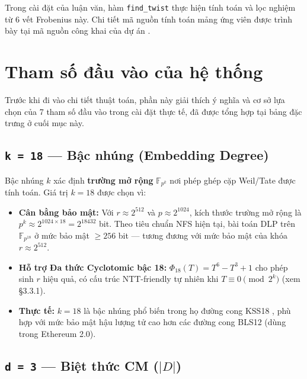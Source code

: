 Trong cài đặt của luận văn, hàm \texttt{find\_twist} thực hiện tính toán
và lọc nghiệm từ 6 vết Frobenius này. Chi tiết mã nguồn tính toán mảng
ứng viên được trình bày tại mã nguồn công khai của dự án
\citep{LumenMath}.

\section{Tham số đầu vào của hệ
thống}\label{tham-sux1ed1-ux111ux1ea7u-vuxe0o-cux1ee7a-hux1ec7-thux1ed1ng}

Trước khi đi vào chi tiết thuật toán, phần này giải thích ý nghĩa và cơ
sở lựa chọn của 7 tham số đầu vào trong cài đặt thực tế, đã được tổng
hợp tại bảng đặc trưng ở cuối mục này.

\subsection{\texorpdfstring{\texttt{k\ =\ 18} --- Bậc nhúng (Embedding
Degree)}{k = 18 --- Bậc nhúng (Embedding Degree)}}\label{k-18-bux1eadc-nhuxfang-embedding-degree}

Bậc nhúng \(k\) xác định \textbf{trường mở rộng} \(\mathbb{F}_{p^k}\)
nơi phép ghép cặp Weil/Tate được tính toán. Giá trị \(k = 18\) được chọn
vì:

\begin{itemize}
\tightlist
\item
  \textbf{Cân bằng bảo mật:} Với \(r \approx 2^{512}\) và
  \(p \approx 2^{1024}\), kích thước trường mở rộng là
  \(p^k \approx 2^{1024 \times 18} = 2^{18432}\) bit. Theo tiêu chuẩn
  NFS hiện tại, bài toán DLP trên \(\mathbb{F}_{p^{18}}\) ở mức bảo mật
  \(\geq 256\) bit --- tương đương với mức bảo mật của khóa
  \(r \approx 2^{512}\).
\item
  \textbf{Hỗ trợ Đa thức Cyclotomic bậc 18:}
  \(\Phi_{18}(T) = T^6 - T^3 + 1\) cho phép sinh \(r\) hiệu quả, có cấu
  trúc NTT-friendly tự nhiên khi \(T \equiv 0 \pmod{2^k}\) (xem §3.3.1).
\item
  \textbf{Thực tế:} \(k = 18\) là bậc nhúng phổ biến trong họ đường cong
  KSS18 \citep{CocksPinchK5K8}, phù hợp với mức bảo mật hậu lượng tử cao
  hơn các đường cong BLS12 (dùng trong Ethereum 2.0).
\end{itemize}

\subsection{\texorpdfstring{\texttt{d\ =\ 3} --- Biệt thức CM
(\(|D|\))}{d = 3 --- Biệt thức CM (\textbar D\textbar)}}\label{d-3-biux1ec7t-thux1ee9c-cm-d}

